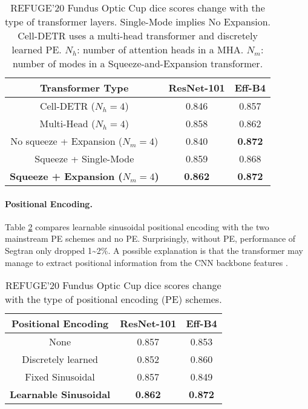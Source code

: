 \documentclass{article}
\begin{document}
\begin{table}[h]
\begin{centering}\setlength\tabcolsep{3pt}
\begin{tabular}{|c|c|c|}
\hline 
Transformer Type & ResNet-101 & Eff-B4 \tabularnewline
\hline 
Cell-DETR ($N_h=4$) &  0.846 & 0.857 \tabularnewline
\hline 
Multi-Head ($N_h=4$) &  0.858 & 0.862 \tabularnewline
\hline 
No squeeze + Expansion ($N_m=4$) &  0.840 & \textbf{0.872} \tabularnewline
\hline 
Squeeze + Single-Mode &  0.859 & 0.868 \tabularnewline
\hline
\textbf{Squeeze + Expansion ($N_m=4$)} &  \textbf{0.862} & \textbf{0.872} \tabularnewline
\hline 
\end{tabular}
\caption{REFUGE'20 Fundus Optic Cup dice scores change with the type of transformer layers. Single-Mode implies No Expansion. Cell-DETR uses a multi-head transformer and discretely learned PE. $N_h$: number of attention heads in a MHA. $N_m$: number of modes in a Squeeze-and-Expansion transformer. }
\label{layer-scheme}
\par\end{centering}
\end{table}

\paragraph{Positional Encoding.}
Table \ref{pos-scheme} compares learnable sinusoidal positional encoding with the two mainstream PE schemes and no PE. Surprisingly, without PE, performance of Segtran only dropped 1\textasciitilde 2\%. A possible explanation is that the transformer may manage to extract positional information from the CNN backbone features \cite{cnn-pos}.
\begin{table}[h]
\begin{centering}
\begin{tabular}{|c|c|c|}
\hline 
Positional Encoding & ResNet-101 & Eff-B4 \tabularnewline
\hline 
None & 0.857  & 0.853 
\tabularnewline
\hline 
Discretely learned & 0.852 & 0.860 \tabularnewline
\hline 
Fixed Sinusoidal & 0.857  & 0.849 \tabularnewline
\hline
\textbf{Learnable Sinusoidal} &  \textbf{0.862} & \textbf{0.872} \tabularnewline
\hline 
\end{tabular}
\caption{REFUGE'20 Fundus Optic Cup dice scores change with the type of positional encoding (PE) schemes.}
\label{pos-scheme}
\par\end{centering}
\end{table}
\end{document}
